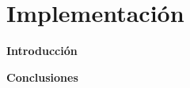 \chapter{Implementación}\label{cap: }

        \textbf{\Large Introducción}\newline

        \textbf{\Large Conclusiones}\newline

